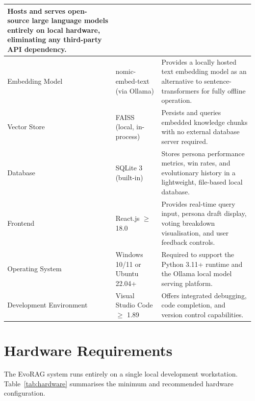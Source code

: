 \begin{center}
\begin{longtable}{|p{3.8cm}|p{3.5cm}|p{6.2cm}|}
Hosts and serves open-source large language models entirely on local
hardware, eliminating any third-party API dependency. \\
\hline
Embedding Model & nomic-embed-text (via Ollama) &
Provides a locally hosted text embedding model as an alternative to
sentence-transformers for fully offline operation. \\
\hline
Vector Store & FAISS (local, in-process) &
Persists and queries embedded knowledge chunks with no external
database server required. \\
\hline
Database & SQLite 3 (built-in) &
Stores persona performance metrics, win rates, and evolutionary
history in a lightweight, file-based local database. \\
\hline
Frontend & React.js $\geq$ 18.0 &
Provides real-time query input, persona draft display, voting breakdown
visualisation, and user feedback controls. \\
\hline
Operating System & Windows 10/11 or Ubuntu 22.04+ &
Required to support the Python 3.11+ runtime and the Ollama local
model serving platform. \\
\hline
Development Environment & Visual Studio Code $\geq$ 1.89 &
Offers integrated debugging, code completion, and version control
capabilities. \\
\hline
\end{longtable}
\end{center}

\clearpage

\section{Hardware Requirements}

The EvoRAG system runs entirely on a single local development workstation.
Table~\ref{tab:hardware} summarises the minimum and recommended hardware configuration.

\vspace{0.5em}

